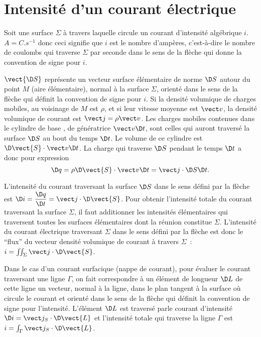 \section{Intensité d'un courant électrique}
\label{chap9-sec:intensiteduncourantelectrique}

Soit une surface $\Sigma$ à travers laquelle circule un courant d'intensité algébrique $i$. $\si{A}=\si{C.s^{-1}}$ donc ceci signifie que $i$ est le nombre d'ampères, c'est-à-dire le nombre de coulombs qui traverse $\Sigma$ par seconde dans le sens de la flèche qui donne la convention de signe pour $i$.

$\vect{\D S}$ représente un vecteur surface élémentaire de norme $\D S$ autour du point $M$ (aire élémentaire), normal à la surface $\Sigma$, orienté dans le sens de la flèche qui définit la convention de signe pour $i$. Si la densité volumique de charges mobiles, au voisinage de $M$ est $\rho$, et si leur vitesse moyenne est $\vv$, la densité volumique de courant est $\vj = \rho \vv$.
Les charges mobiles contenues dans le cylindre de base , de génératrice $\vv \D t$, sont celles qui auront traversé la surface $\D S$ au bout du temps $\D t$. Le volume de ce cylindre est $\D \vect{S} \cdot \vv\D t$.
La charge qui traverse $\D S$ pendant le temps $\D t$ a donc pour expression
\begin{equation}
  \D q = \rho \D \vect{S} \cdot \vv \D t = \vj \cdot \D S \D t.
\end{equation}

L'intensité du courant traversant la surface $\D S$ dans le sens défini par la flèche est $\D i = \derived{q}{t} = \vj \cdot \D \vect{S}$.
Pour obtenir l'intensité totale du courant traversant la surface $\Sigma$, il faut additionner les intensités élémentaires qui traversent toutes les surfaces élémentaires dont la réunion constitue $\Sigma$.
L'intensité du courant électrique traversant $\Sigma$ dans le sens défini par la flèche est donc le ``flux'' du vecteur densité volumique de courant à travers $\Sigma$~: $i = \iint_\Sigma \vj \cdot \D \vect{S}$.

Dans le cas d'un courant surfacique (nappe de courant), pour évaluer le courant  traversant une ligne $\Gamma$, on fait correspondre à un élément de longueur $\D L$ de cette ligne un vecteur, normal à la ligne, dans le plan tangent à la surface où circule le courant et orienté dans le sens de la flèche qui définit la convention de signe pour l'intensité. L'élément $\D L$ est traversé parle courant d'intensité $\D i = \vj_S \cdot \D \vect{L}$ et l'intensité totale qui traverse la ligne $\Gamma$ est $i = \int_\Gamma \vj_S \cdot \D \vect{L}$.

